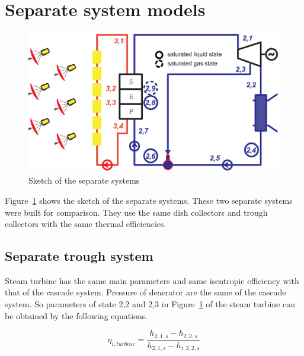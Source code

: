 \documentclass{article}
\begin{document}
%

\section{Separate system models}

\noindent \begin{figure}[htbp]
\begin{center}
	\includegraphics[width = 0.7\columnwidth]{./graphics/separateSystem}
	\caption{Sketch of the separate systems}
	\label{fig:System-2}
\end{center}
\end{figure}

Figure~\ref{fig:System-2} shows the sketch of the separate systems. These two separate systems were built for comparison. They use the same dish collectors and trough collectors with the same thermal efficiencies.

\subsection{Separate trough system}

Steam turbine has the same main parameters and same isentropic efficiency with that of the cascade system. Pressure of deaerator are the same of the cascade system. So parameters of state 2,2 and 2,3 in Figure~\ref{fig:System-2} of the steam turbine can be obtained by the following equations.

\begin{equation*}
	\eta_{i,turbine}=\frac{h_{2,1,s}-h_{2,2,s}}{h_{2,1,s}-h_{i,2,2,s}}
\end{equation*}
\end{document}
